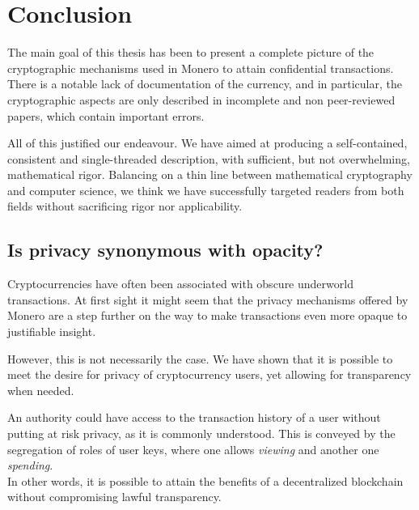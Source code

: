 

\chapter{Conclusion}
\label{chapter:conclusion}

The main goal of this thesis has been to present a complete picture of the cryptographic mechanisms used in Monero
to attain confidential transactions. There is a notable lack of documentation of the currency, and in particular,
the cryptographic aspects are only described in incomplete and non peer-reviewed papers, which contain important
errors.

All of this justified our endeavour. We have aimed at producing a self-contained, consistent and single-threaded description,
with sufficient, but not overwhelming, mathematical rigor. Balancing on a thin line between mathematical cryptography 
and computer science,
we think we have successfully targeted readers from both fields without sacrificing rigor nor applicability.


\section{Is privacy synonymous with opacity?}

Cryptocurrencies have often been associated with obscure underworld transactions.
At first sight it might seem that the privacy mechanisms offered by Monero are a step further
on the way to make transactions even more opaque to justifiable insight.

However, this is not necessarily the case.
We have shown that it is possible to meet the desire for privacy of cryptocurrency users, yet
allowing for transparency when needed. 

An authority could have access to the transaction history
of a user without putting at risk privacy, as it is commonly understood.
This is conveyed by the segregation of roles of user keys, where one allows {\em viewing}
and another one {\em spending}. 
\\

In other words, it is possible to attain the benefits of a decentralized blockchain
without compromising lawful transparency.



